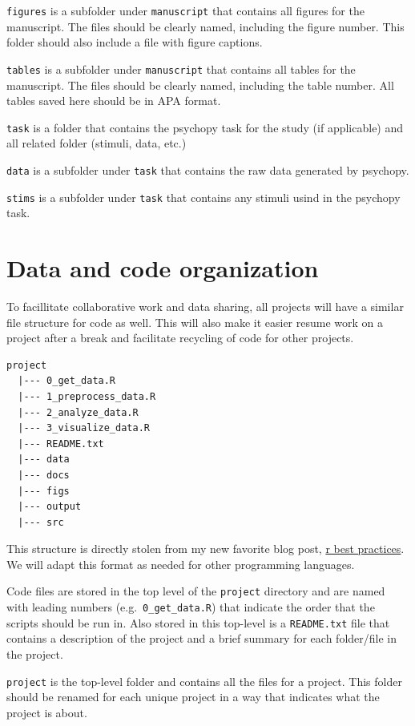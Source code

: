 \documentclass[
]{book}
\begin{document}
\texttt{figures} is a subfolder under \texttt{manuscript} that contains all figures for the manuscript. The files should be clearly named, including the figure number. This folder should also include a file with figure captions.

\texttt{tables} is a subfolder under \texttt{manuscript} that contains all tables for the manuscript. The files should be clearly named, including the table number. All tables saved here should be in APA format.

\texttt{task} is a folder that contains the psychopy task for the study (if applicable) and all related folder (stimuli, data, etc.)

\texttt{data} is a subfolder under \texttt{task} that contains the raw data generated by psychopy.

\texttt{stims} is a subfolder under \texttt{task} that contains any stimuli usind in the psychopy task.

\hypertarget{data-and-code-organization}{%
\section{Data and code organization}\label{data-and-code-organization}}

To facillitate collaborative work and data sharing, all projects will have a similar file structure for code as well. This will also make it easier resume work on a project after a break and facilitate recycling of code for other projects.

\begin{verbatim}
project 
  |--- 0_get_data.R
  |--- 1_preprocess_data.R
  |--- 2_analyze_data.R
  |--- 3_visualize_data.R
  |--- README.txt
  |--- data
  |--- docs
  |--- figs
  |--- output
  |--- src
\end{verbatim}

This structure is directly stolen from my new favorite blog post, \href{https://kdestasio.github.io/post/r_best_practices/}{r best practices}. We will adapt this format as needed for other programming languages.

Code files are stored in the top level of the \texttt{project} directory and are named with leading numbers (e.g.~\texttt{0\_get\_data.R}) that indicate the order that the scripts should be run in. Also stored in this top-level is a \texttt{README.txt} file that contains a description of the project and a brief summary for each folder/file in the project.

\texttt{project} is the top-level folder and contains all the files for a project. This folder should be renamed for each unique project in a way that indicates what the project is about.
\end{document}
